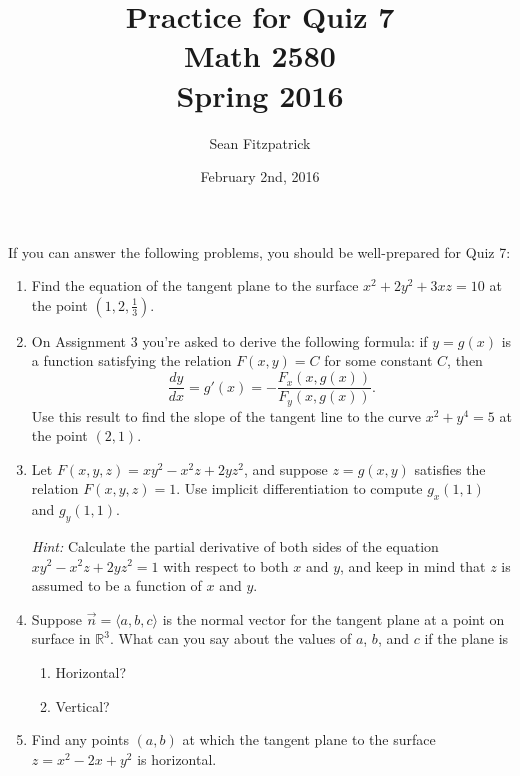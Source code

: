 \documentclass[letterpaper,12pt]{article}
\title{Practice for Quiz 7\\Math 2580\\Spring 2016}
\author{Sean Fitzpatrick}
\date{February 2nd, 2016}
\newcommand{\R}{\mathbb{R}}
\begin{document}
 \maketitle

If you can answer the following problems, you should be well-prepared for Quiz 7:



\begin{enumerate}
 \item Find the equation of the tangent plane to the surface $x^2+2y^2+3xz=10$ at the point $(1,2,\frac{1}{3})$.
 \item On Assignment 3 you're asked to derive the following formula: if $y=g(x)$ is a function satisfying the relation $F(x,y)=C$ for some constant $C$, then
\[
 \frac{dy}{dx} = g'(x) = -\frac{F_x(x,g(x))}{F_y(x,g(x))}.
\]
Use this result to find the slope of the tangent line to the curve $x^2+y^4=5$ at the point $(2,1)$.
 \item Let $F(x,y,z) = xy^2-x^2z+2yz^2$, and suppose $z=g(x,y)$ satisfies the relation $F(x,y,z)=1$. Use implicit differentiation to compute $g_x(1,1)$ and $g_y(1,1)$.

{\em Hint:} Calculate the partial derivative of both sides of the equation $xy^2-x^2z+2yz^2=1$ with respect to both $x$ and $y$, and keep in mind that $z$ is assumed to be a function of $x$ and $y$.

 \item Suppose $\vec{n} = \langle a,b,c\rangle$ is the normal vector for the tangent plane at a point on surface in $\R^3$. What can you say about the values of $a$, $b$, and $c$ if the plane is
\begin{enumerate}
 \item Horizontal?
 \item Vertical?
\end{enumerate}
 \item Find any points $(a,b)$ at which the tangent plane to the surface $z=x^2-2x+y^2$ is horizontal.
\end{enumerate}
\end{document}
